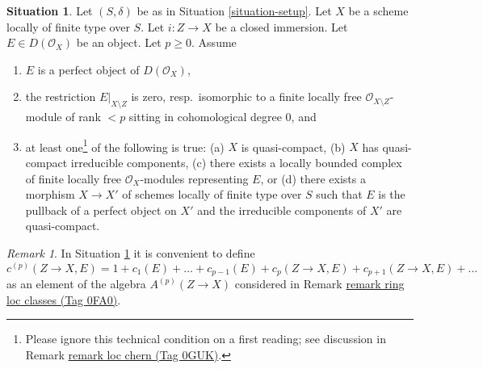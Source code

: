 \documentclass{amsart}
\theoremstyle{plain}
\theoremstyle{definition}
\newtheorem{situation}[subsection]{Situation}
\theoremstyle{remark}
\newtheorem{remark}[subsection]{Remark}
\numberwithin{equation}{subsection}
\begin{document}
\begin{situation}
\label{situation-loc-chern}
Let $(S, \delta)$ be as in Situation \ref{situation-setup}. Let $X$ be a scheme
locally of finite type over $S$. Let $i : Z \to X$ be a closed immersion.
Let $E \in D(\mathcal{O}_X)$ be an object. Let $p \geq 0$. Assume
\begin{enumerate}
\item $E$ is a perfect object of $D(\mathcal{O}_X)$,
\item the restriction $E|_{X \setminus Z}$ is zero, resp.\ isomorphic to a
finite locally free $\mathcal{O}_{X \setminus Z}$-module of rank $< p$
sitting in cohomological degree $0$, and
\item at least one\footnote{Please ignore this technical condition on a
first reading; see discussion in Remark \href{https://stacks.math.columbia.edu/tag/0GUK}{remark loc chern (Tag 0GUK)}.}
of the following is true:
(a) $X$ is quasi-compact,
(b) $X$ has quasi-compact irreducible components,
(c) there exists a locally bounded complex of finite locally free
$\mathcal{O}_X$-modules representing $E$, or
(d) there exists a morphism $X \to X'$ of schemes locally of finite type
over $S$ such that $E$ is the pullback of a perfect object on $X'$ and
the irreducible components of $X'$ are quasi-compact.
\end{enumerate}
\end{situation}

\begin{remark}
\label{remark-loc-chern-classes}
In Situation \ref{situation-loc-chern} it is convenient to define
$$
c^{(p)}(Z \to X, E) = 1 + c_1(E) + \ldots + c_{p - 1}(E) +
c_p(Z \to X, E) + c_{p + 1}(Z \to X, E) + \ldots
$$
as an element of the algebra $A^{(p)}(Z \to X)$ considered in
Remark \href{https://stacks.math.columbia.edu/tag/0FA0}{remark ring loc classes (Tag 0FA0)}.
\end{remark}
\end{document}
